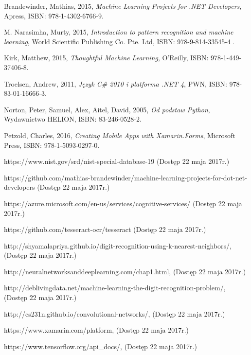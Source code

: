 \documentclass[brudnopis]{xmgr}
\begin{document}



\begin{thebibliography}{9}

  Brandewinder,
  Mathias,
  2015,
  \emph{Machine Learning Projects for .NET Developers},
  Apress,
  ISBN: 978-1-4302-6766-9.

  M. Narasimha,
  Murty,
  2015,
  \emph{Introduction to pattern recognition and machine learning},
  World Scientific Publishing Co. Pte. Ltd,
  ISBN: 978-9-814-33545-4 .  

  Kirk,
  Matthew,
  2015,
  \emph{Thoughtful Machine Learning},
  O'Reilly,
  ISBN: 978-1-449-37406-8.
  
  Troelsen,
  Andrew,
  2011,
  \emph{Język C\# 2010 i platforma .NET 4},
  PWN,
  ISBN: 978-83-01-16666-3.
  
  Norton,
  Peter,
  Samuel,
  Alex,
  Aitel,
  David,
  2005,
  \emph{Od podstaw Python},
  Wydawnictwo HELION,
  ISBN: 83-246-0528-2.  
  
  Petzold,
  Charles,
  2016,
  \emph{Creating Mobile Apps with Xamarin.Forms},
  Microsoft Press,
  ISBN: 978-1-5093-0297-0.  

  https://www.nist.gov/srd/nist-special-database-19
  (Dostęp 22 maja 2017r.)

  https://github.com/mathias-brandewinder/machine-learning-projects-for-dot-net-developers
  (Dostęp 22 maja 2017r.)
  
  https://azure.microsoft.com/en-us/services/cognitive-services/
  (Dostęp 22 maja 2017r.)

  https://github.com/tesseract-ocr/tesseract
  (Dostęp 22 maja 2017r.)
  
  http://shyamalapriya.github.io/digit-recognition-using-k-nearest-neighbors/,
  (Dostęp 22 maja 2017r.)

  http://neuralnetworksanddeeplearning.com/chap1.html,
  (Dostęp 22 maja 2017r.)

  http://deblivingdata.net/machine-learning-the-digit-recognition-problem/,
  (Dostęp 22 maja 2017r.)

  http://cs231n.github.io/convolutional-networks/, 
  (Dostęp 22 maja 2017r.)

  https://www.xamarin.com/platform, 
  (Dostęp 22 maja 2017r.)

  https://www.tensorflow.org/api\_docs/, 
  (Dostęp 22 maja 2017r.)


\end{thebibliography}
\end{document}
